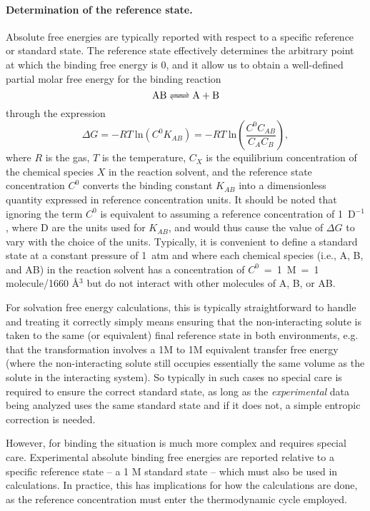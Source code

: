 \documentclass[9pt,bestpractices]{livecoms}
\begin{document}
\paragraph{Determination of the reference state.}

Absolute free energies are typically reported with respect to a specific reference or standard state.
The reference state effectively determines the arbitrary point at which the binding free energy is 0, and it allow us to obtain a well-defined partial molar free energy for the binding reaction
\begin{equation*}
\ce{AB <=> A + B}
\end{equation*}
through the expression
\begin{equation} \label{eq:DGfromKAB}
\Delta G = -RT ~ \text{ln} \left( C^0 K_{AB} \right)  = -RT ~ \text{ln}\left( \frac{C^0 C_{AB}}{C_A C_B} \right) ,
\end{equation}
where $R$ is the gas, $T$ is the temperature, $C_X$ is the equilibrium concentration of the chemical species $X$ in the reaction solvent, and the reference state concentration $C^0$ converts the binding constant $K_{AB}$ into a dimensionless quantity expressed in reference concentration units.
It should be noted that ignoring the term $C^0$ is equivalent to assuming a reference concentration of 1~D$^{-1}$, where D are the units used for $K_{AB}$, and would thus cause the value of $\Delta G$ to vary with the choice of the units.
Typically, it is convenient to define a standard state at a constant pressure of 1~atm and where each chemical species (i.e., A, B, and AB) in the reaction solvent has a concentration of $C^0$~=~1~M~=~1 molecule/1660 \r{A}$^3$ but do not interact with other molecules of A, B, or AB.

For solvation free energy calculations, this is typically straightforward to handle and treating it correctly simply means ensuring that the non-interacting solute is taken to the same (or equivalent) final reference state in both environments, e.g. that the transformation involves a 1M to 1M equivalent transfer free energy (where the non-interacting solute still occupies essentially the same volume as the solute in the interacting system).
So typically in such cases no special care is required to ensure the correct standard state, as long as the \emph{experimental} data being analyzed uses the same standard state and if it does not, a simple entropic correction is needed.

However, for binding the situation is much more complex and requires special care.
Experimental absolute binding free energies are reported relative to a specific reference state -- a 1 M standard state -- which must also be used in calculations.
In practice, this has implications for how the calculations are done, as the reference concentration must enter the thermodynamic cycle employed.
\end{document}
